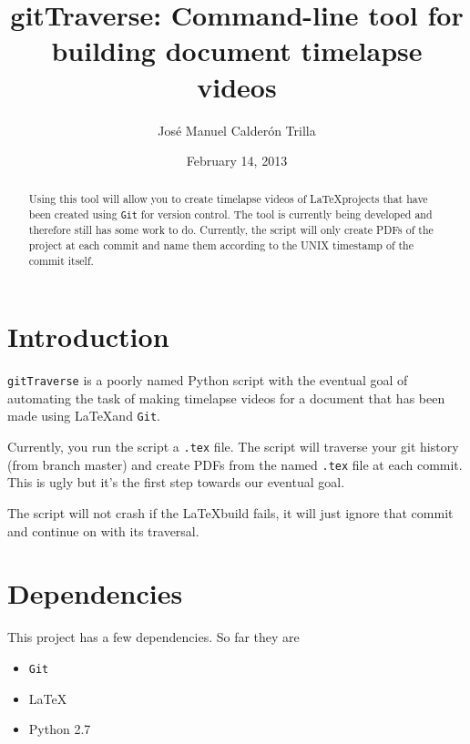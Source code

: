 \documentclass{article}
\title{gitTraverse: Command-line tool for building document timelapse videos}
\author{Jos\'{e} Manuel Calder\'{o}n Trilla}
\date{February 14, 2013}
\begin{document}
\maketitle

\begin{abstract}
Using this tool will allow you to create timelapse videos of \LaTeX projects
that have been created using \verb=Git= for version control. The tool is
currently being developed and therefore still has some work to do. Currently,
the script will only create PDFs of the project at each commit and name them
according to the UNIX timestamp of the commit itself. 
\end{abstract}

\section{Introduction}
\verb=gitTraverse= is a poorly named Python script with the eventual goal of automating
the task of making timelapse videos for a document that has been made using \LaTeX and
\verb=Git=.

Currently, you run the script a \verb=.tex= file. The script will traverse your git 
history (from branch master) and create PDFs from the named \verb=.tex= file at
each commit. This is ugly but it's the first step towards our eventual goal.

The script will not crash if the \LaTeX build fails, it will just ignore that
commit and continue on with its traversal.

\newpage
\section{Dependencies}
This project has a few dependencies. So far they are

    \begin{itemize}
        \item \verb=Git=
        \item \LaTeX
        \item Python 2.7
    \end{itemize}
\end{document}
